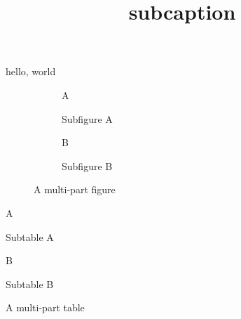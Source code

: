 \documentclass{amsart}
\title{subcaption}
\begin{document}
{\tt\meaning\subfigure}

\maketitle

hello, world

\begin{figure}

\begin{subfigure}[b]{.5\linewidth}
\centering\large A
\caption{Subfigure A}
\end{subfigure}

\begin{subfigure}[b]{.5\linewidth}
\centering\large B
\caption{Subfigure B}
\end{subfigure}

\caption{A multi-part figure}

\end{figure}

\begin{table}

\begin{subtable}[b]{.5\linewidth}
\centering\large A
\caption{Subtable A}
\end{subtable}

\begin{subtable}[b]{.5\linewidth}
\centering\large B
\caption{Subtable B}
\end{subtable}

\caption{A multi-part table}

\end{table}
\end{document}
